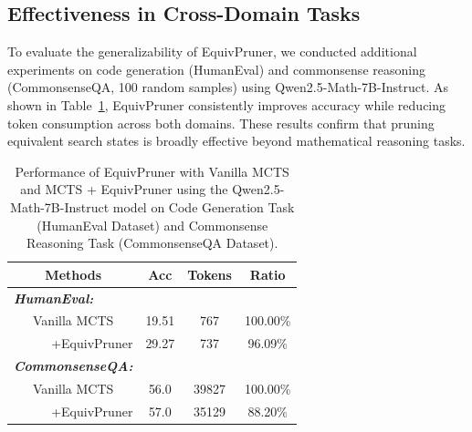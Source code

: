 \documentclass[11pt]{article}
\begin{document}
\subsection{Effectiveness in Cross-Domain Tasks}
To evaluate the generalizability of EquivPruner, we conducted additional experiments on code generation (HumanEval) and commonsense reasoning (CommonsenseQA, 100 random samples) using Qwen2.5-Math-7B-Instruct. As shown in Table~\ref{tab:cross}, EquivPruner consistently improves accuracy while reducing token consumption across both domains. These results confirm that pruning equivalent search states is broadly effective beyond mathematical reasoning tasks.
\begin{table}[t]
\centering
\caption{Performance of EquivPruner with Vanilla MCTS and MCTS + EquivPruner using the Qwen2.5-Math-7B-Instruct model on Code Generation Task (HumanEval Dataset) and Commonsense Reasoning Task (CommonsenseQA Dataset).}
\label{tab:cross}
\begin{tabular}{cccc}
\hline
Methods                                      & Acc                  & Tokens                        & Ratio                \\ \hline
\multicolumn{1}{l}{\textit{\textbf{HumanEval:}}}  & \multicolumn{1}{l}{} & \multicolumn{1}{l}{\textbf{}} & \multicolumn{1}{l}{} \\
Vanilla MCTS                                          & 19.51                & 767                & 100.00\%             \\
\multicolumn{1}{r}{+EquivPruner}             & 29.27                & 737                & 96.09\%              \\ \hline
\multicolumn{1}{l}{\textit{\textbf{CommonsenseQA:}}} & \multicolumn{1}{l}{} & \multicolumn{1}{l}{}          & \multicolumn{1}{l}{} \\
Vanilla MCTS                                          & 56.0                & 39827                         & 100.00\%             \\
\multicolumn{1}{r}{+EquivPruner}             & 57.0                & 35129                          & 88.20\%              \\ \hline
\end{tabular}
\end{table}
\end{document}
